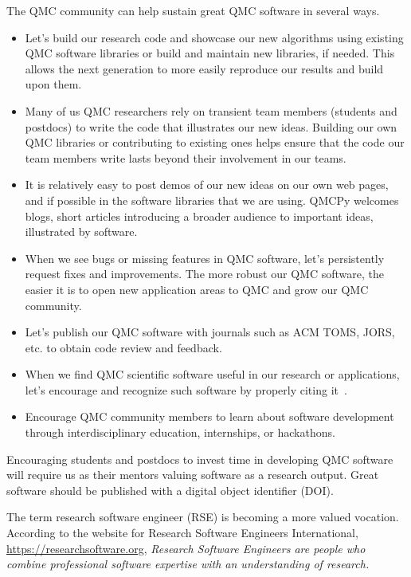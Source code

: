 \documentclass[graybox]{svmult}
\begin{document}
The QMC community can help sustain great QMC software in several ways.  \begin{itemize}
	\item Let's build our research code and showcase our new algorithms using existing QMC software libraries or build and maintain new libraries, if needed.  This allows the next generation to more easily reproduce our results and build upon them.

	\item Many of us QMC researchers rely on transient team members (students and postdocs) to write the code that illustrates our new ideas.  Building our own QMC libraries or contributing to existing ones helps ensure that the code our team members write lasts beyond their involvement in our teams.

	\item It is relatively easy to post demos of our new ideas on our own web pages, and if possible in the software libraries that we are using.  QMCPy welcomes blogs, short articles introducing a broader audience to important ideas, illustrated by software.

	\item When we see bugs or missing features in QMC software, let's persistently request fixes and improvements.  The more robust our QMC software, the easier it is to open new application areas to QMC and grow our QMC community.

    \item Let's publish our QMC  software with journals such as ACM TOMS, JORS, etc. to obtain code review and
    feedback.

    \item When we find QMC scientific software useful in our research or applications, let's encourage and recognize such software by properly citing it~\cite{smith2016software}.

    \item Encourage QMC community members to learn about software development through interdisciplinary education, internships, or hackathons.

\end{itemize}


Encouraging students and postdocs to invest time in developing QMC software will require us as their mentors valuing software as a research output.  Great software should be published with a digital object identifier (DOI).

The term research software engineer (RSE) is becoming a more valued vocation.  According to the website for  Research Software Engineers International,
\href{https://researchsoftware.org}{\url{https://researchsoftware.org}}, \emph{Research Software Engineers are people who combine professional software expertise with an understanding of research.}
\end{document}
